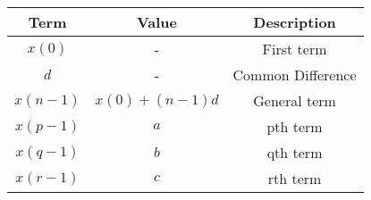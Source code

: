 \begin{tabular}{|c|c|c|}
    \hline
    \textbf{Term} & \textbf{Value} & \textbf{Description}\\
    \hline
    $x(0)$ & - & First term\\
    \hline
    $d$ & - & Common Difference\\
    \hline
    $x(n-1)$ & $x(0)+(n-1)d$ & General term\\
    \hline
    $x(p-1)$ & $a$ & pth term\\
    \hline
    $x(q-1)$ & $b$ & qth term\\
    \hline
    $x(r-1)$ & $c$ & rth term\\
    \hline
  \end{tabular}
  
